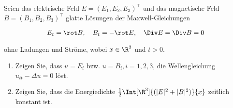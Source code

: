
\begin{exercise}

Seien das elektrische Feld $E = (E_1, E_2, E_3)^\top$ und das magnetische Feld $B = (B_1, B_2, B_3)^\top$ glatte Lösungen der Maxwell-Gleichungen

\begin{align*}
    E_t = \rot B, \quad B_t = -\rot E,
    \quad
    \Div E = \Div B = 0
\end{align*}

ohne Ladungen und Ströme, wobei $x \in \R^3$ und $t > 0$.

\begin{enumerate}[label = (\roman*)]
    \item Zeigen Sie, dass $u = E_i$ bzw. $u = B_i, i = 1, 2, 3$, die Wellengleichung $u_{tt} - \Delta u = 0$ löst.
    \item Zeigen Sie, dass die Energiedichte $\frac{1}{2} \Int[\R^3]{(|E|^2+|B|^2)}{x}$ zeitlich konstant ist.
\end{enumerate}

\end{exercise}


